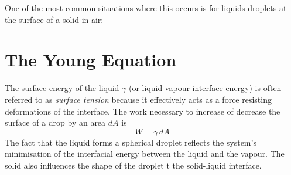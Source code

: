 \documentclass[a4paper, 11pt, normalem]{report}
\begin{document}
One of the most common situations where this occurs is for liquids droplets at the surface of a solid in air:
\begin{figure}[H]
    \centering
\end{figure}

\section{The Young Equation}
The surface energy of the liquid $\gamma$ (or liquid-vapour interface energy) is often referred to as \textit{surface tension} because it effectively acts as a force resisting deformations of the interface.
The work necessary to increase of decrease the surface of a drop by an area $dA$ is
\begin{equation}
    W = \gamma\,dA
\end{equation}
The fact that the liquid forms a spherical droplet reflects the system's minimisation of the interfacial energy between the liquid and the vapour.
The solid also influences the shape of the droplet t the solid-liquid interface.
\end{document}
